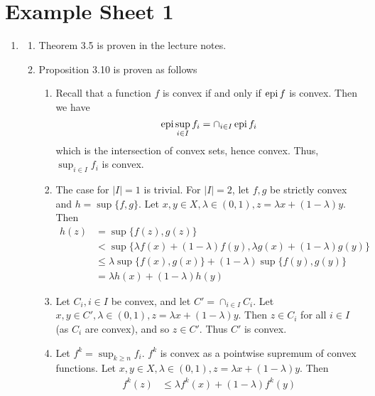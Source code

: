 \chapter{Example Sheet 1}
\label{cha:example-sheet-1}

\begin{enumerate}[label*=Ex \arabic*.]
\item \label{item:1}
  \begin{enumerate}
  \item Theorem 3.5 is proven in the lecture notes.
  \item Proposition 3.10 is proven as follows
    \begin{enumerate}
    \item Recall that a function $f$ is convex if and only if $\operatorname*{epi} f$
      is convex. Then we have
      \begin{equation}
        \label{eq:1}
        \operatorname*{epi} \sup_{i \in I} f_{i} = \cap_{i \in I} \operatorname*{epi} f_{i}
      \end{equation} which is the intersection of convex sets, hence
      convex.  Thus, $\sup_{i \in I} f_{i}$ is convex.
    \item The case for $|I| = 1$ is trivial. For $|I| = 2$, let $f, g$
      be strictly convex and $h = \sup \{ f, g \}$. Let $x, y \in X,
      \lambda \in (0, 1), z = \lambda x + (1-\lambda) y$. Then
      \begin{align}
        \label{eq:2}
        h(z) &= \sup \{ f(z), g(z) \} \\
        &< \sup \{ \lambda f(x) + (1-\lambda) f(y), \lambda g(x) +
        (1-\lambda) g(y) \} \\
        &\leq \lambda \sup \{ f(x), g(x) \} + (1-\lambda) \sup \{
        f(y), g(y) \} \\
        &= \lambda h(x) + (1 - \lambda) h(y)
      \end{align}
    \item Let $C_{i}, i \in I$ be convex, and let $C' = \cap_{i \in I}
      C_{i}$. Let $x, y \in C', \lambda \in (0, 1), z = \lambda x +
      (1-\lambda)y$.  Then $z \in C_{i}$ for all $i \in I$ (as $C_{i}$
      are convex), and so $z \in C'$. Thus $C'$ is convex.
    \item Let $f^{k} = \sup_{k \geq n} f_{i}$. $f^{k}$ is convex as a
      pointwise supremum of convex functions.  Let $x, y \in X, \lambda
      \in (0, 1), z = \lambda x + (1-\lambda)y$. Then
      \begin{align}
        \label{eq:4}
        f^{k}(z) &\leq \lambda f^{k}(x) + (1-\lambda) f^{k}(y) \\

\end{align}
\end{enumerate}
\end{enumerate}
\end{enumerate}
